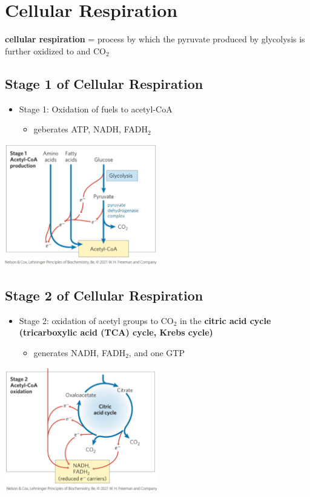 \documentclass[10pt]{article}
\newcommand{\water}{\text{H$_2$O}}
\begin{document}
\section*{Cellular Respiration}
\textbf{cellular respiration} = process by which the pyruvate produced by glycolysis is further oxidized to \water and CO$_2$

\subsection*{Stage 1 of Cellular Respiration}
\begin{itemize}
	\item Stage 1: Oxidation of fuels to acetyl-CoA
	\begin{itemize}
        \item geberates ATP, NADH, FADH$_2$
    \end{itemize}
\end{itemize}
\begin{center} 
	\includegraphics*[width=0.5\textwidth]{L3_1.png}
\end{center}

\subsection*{Stage 2 of Cellular Respiration}
\begin{itemize}
	\item Stage 2: oxidation of acetyl groups to CO$_2$ in the \textbf{citric acid cycle (tricarboxylic acid (TCA) cycle, Krebs cycle)}
	\begin{itemize}
        \item generates NADH, FADH$_2$, and one GTP
    \end{itemize}
\end{itemize}

\begin{center} 
	\includegraphics*[width=0.5\textwidth]{L3_2.png}
\end{center}
\end{document}
